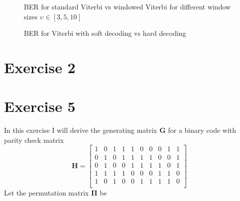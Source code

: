 \documentclass[10pt]{article}
\newlength\fheight
\newlength\fwidth
\begin{document}
\begin{figure}[t]
\centering
\setlength{}
\setlength{}
%
\caption{BER for standard Viterbi vs windowed Viterbi for different window sizes $\upsilon \in [3, 5, 10]$}
\label{fig:BER_2}
\end{figure}

\begin{figure}[t]
\centering
\setlength{}
\setlength{}
%
\caption{BER for Viterbi with soft decoding vs hard decoding}
\label{fig:BER_3}
\end{figure}





\section*{Exercise 2}

\section*{Exercise 5}
In this exercise I will derive the generating matrix $\mathbf{G}$ for a binary code with parity check matrix
\begin{equation}
	\mathbf{H} = 
	\begin{bmatrix}
		1&0&1&1&1&0&0&0&1&1\\
		0&1&0&1&1&1&1&0&0&1\\
		0&1&0&0&1&1&1&1&0&1\\
		1&1&1&1&0&0&0&1&1&0\\
		1&0&1&0&0&1&1&1&1&0\\
	\end{bmatrix}
\end{equation}
Let the permutation matrix $\mathbf{\Pi}$ be
\end{document}
